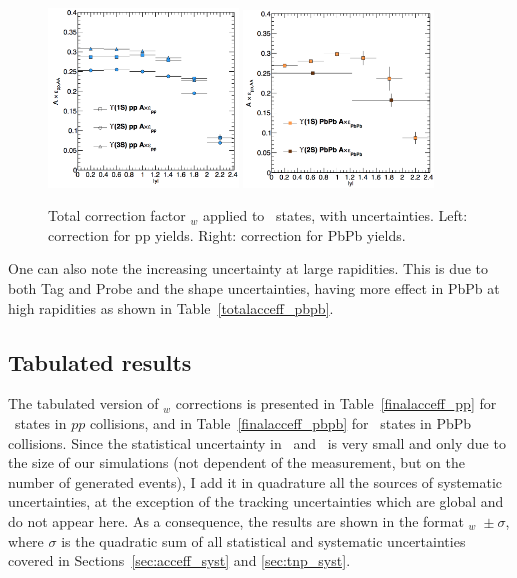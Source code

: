 \begin{figure}
  \begin{center}
    \includegraphics[width=0.45\textwidth]{Chapters/aCorrection/pp_aet.png}
    \includegraphics[width=0.45\textwidth]{Chapters/aCorrection/AA_aet.png}
    \caption{
      Total correction factor \acc\eff$_{w}$ applied to
      \PgU\ states, with uncertainties. 
      Left: correction for pp yields. Right: correction for PbPb yields.
    }
    \label{fig:aet_final}
  \end{center}
\end{figure}

One can also note the increasing uncertainty at large rapidities. This
is due to both Tag and Probe and the shape uncertainties, having more
effect in PbPb at high rapidities as shown in
Table~\ref{totalacceff_pbpb}. 
\subsection{Tabulated results}
The tabulated version of \acc\eff$_{w}$ corrections is presented in
Table~\ref{finalacceff_pp} for \PgU\ states in $pp$ collisions, and in
Table~\ref{finalacceff_pbpb} for \PgU\ states in PbPb collisions. Since the statistical
uncertainty in \acc\ and \eff\ is very small and only due to the size of
our simulations (not dependent of the measurement, but on the number
of generated events), I add it in quadrature all the sources of
systematic uncertainties, at the exception of the tracking
uncertainties which are global and do not appear here. As a
consequence, the results are shown in the format \acc\eff$_w$~$\pm~\sigma$, where $\sigma$ is the quadratic sum of all statistical and
systematic uncertainties covered in Sections~\ref{sec:acceff_syst} and
\ref{sec:tnp_syst}. 




